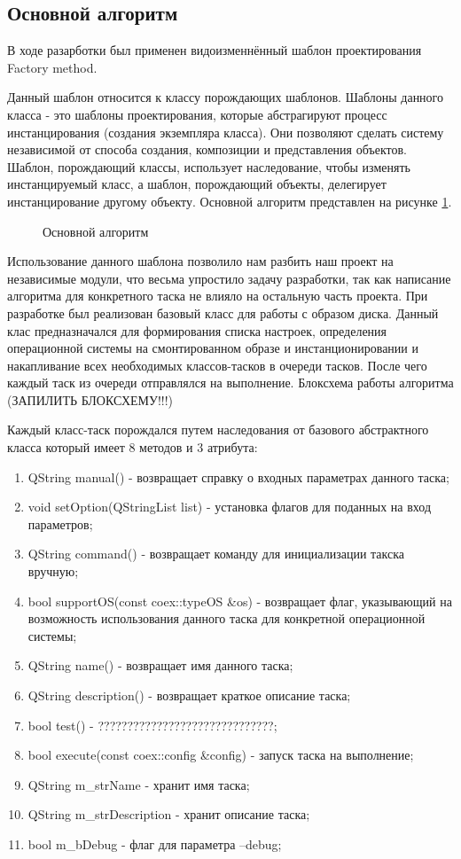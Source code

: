 \subsection{Основной алгоритм}
В ходе разарботки был применен видоизменнённый шаблон проектирования Factory method.

Данный шаблон относится к классу порождающих шаблонов. Шаблоны данного класса - это шаблоны проектирования, которые абстрагируют процесс инстанцирования (создания экземпляра класса). Они позволяют сделать систему независимой от способа создания, композиции и представления объектов. Шаблон, порождающий классы, использует наследование, чтобы изменять инстанцируемый класс, а шаблон, порождающий объекты, делегирует инстанцирование другому объекту.
Основной алгоритм представлен на рисунке \ref{architech:architech}.

\begin{figure}[h!]
\caption{Основной алгоритм}
\label{architech:architech}
\end{figure}

Использование данного шаблона позволило нам разбить наш проект на независимые модули, что весьма упростило задачу разработки, так как написание алгоритма для конкретного таска не влияло на остальную часть проекта. При разработке был реализован базовый класс для работы с образом диска. Данный клас предназначался для формирования списка настроек, определения операционной системы на смонтированном образе и инстанционировании и накапливание всех необходимых классов-тасков в очереди тасков. После чего каждый таск из очереди отправлялся на выполнение. Блоксхема работы алгоритма (ЗАПИЛИТЬ БЛОКСХЕМУ!!!)

Каждый класс-таск порождался путем наследования от базового абстрактного класса который имеет 8 методов и 3 атрибута:

\begin{enumerate}
\item QString manual() - возвращает справку о входных параметрах данного таска;
\item void setOption(QStringList list) - установка флагов для поданных на вход параметров;
\item QString command() - возвращает команду для инициализации такска вручную;
\item bool supportOS(const coex::typeOS \&os) - возвращает флаг, указывающий на возможность использования данного таска для конкретной операционной системы;
\item QString name() - возвращает имя данного таска;
\item QString description() - возвращает краткое описание таска;
\item bool test() - ??????????????????????????????;
\item bool execute(const coex::config \&config) - запуск таска на выполнение;
\item QString m\_strName - хранит имя таска;
\item QString m\_strDescription - хранит описание таска;
\item bool m\_bDebug - флаг для параметра --debug;
\end{enumerate}
